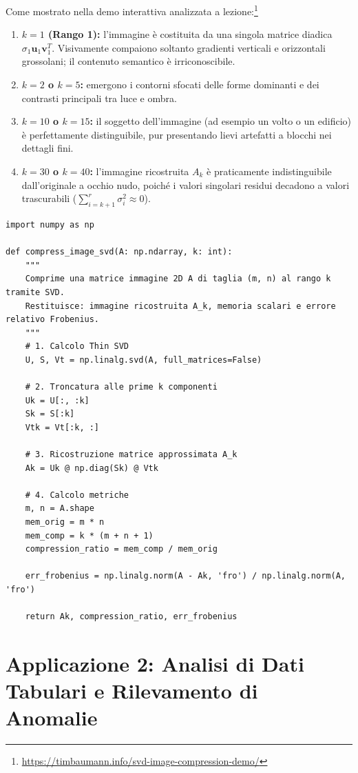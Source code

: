 Come mostrato nella demo interattiva analizzata a lezione:\footnote{\url{https://timbaumann.info/svd-image-compression-demo/}}
\begin{enumerate}
    \item \textbf{$k = 1$ (Rango 1):} l'immagine \`e costituita da una singola matrice diadica $\sigma_1 \mathbf{u}_1 \mathbf{v}_1^T$. Visivamente compaiono soltanto gradienti verticali e orizzontali grossolani; il contenuto semantico \`e irriconoscibile.
    \item \textbf{$k = 2$ o $k = 5$:} emergono i contorni sfocati delle forme dominanti e dei contrasti principali tra luce e ombra.
    \item \textbf{$k = 10$ o $k = 15$:} il soggetto dell'immagine (ad esempio un volto o un edificio) \`e perfettamente distinguibile, pur presentando lievi artefatti a blocchi nei dettagli fini.
    \item \textbf{$k = 30$ o $k = 40$:} l'immagine ricostruita $A_k$ \`e praticamente indistinguibile dall'originale a occhio nudo, poich\'e i valori singolari residui decadono a valori trascurabili ($\sum_{i=k+1}^r \sigma_i^2 \approx 0$).
\end{enumerate}

\begin{lstlisting}[style=pythoncode, caption={Implementazione Python di compressione immagini e calcolo dell'errore relativo con SVD.}]
import numpy as np

def compress_image_svd(A: np.ndarray, k: int):
    """
    Comprime una matrice immagine 2D A di taglia (m, n) al rango k tramite SVD.
    Restituisce: immagine ricostruita A_k, memoria scalari e errore relativo Frobenius.
    """
    # 1. Calcolo Thin SVD
    U, S, Vt = np.linalg.svd(A, full_matrices=False)
    
    # 2. Troncatura alle prime k componenti
    Uk = U[:, :k]
    Sk = S[:k]
    Vtk = Vt[:k, :]
    
    # 3. Ricostruzione matrice approssimata A_k
    Ak = Uk @ np.diag(Sk) @ Vtk
    
    # 4. Calcolo metriche
    m, n = A.shape
    mem_orig = m * n
    mem_comp = k * (m + n + 1)
    compression_ratio = mem_comp / mem_orig
    
    err_frobenius = np.linalg.norm(A - Ak, 'fro') / np.linalg.norm(A, 'fro')
    
    return Ak, compression_ratio, err_frobenius
\end{lstlisting}

\FloatBarrier
\section{Applicazione 2: Analisi di Dati Tabulari e Rilevamento di Anomalie}
\label{sec:applicazione-dati-tabulari-anomalie}

